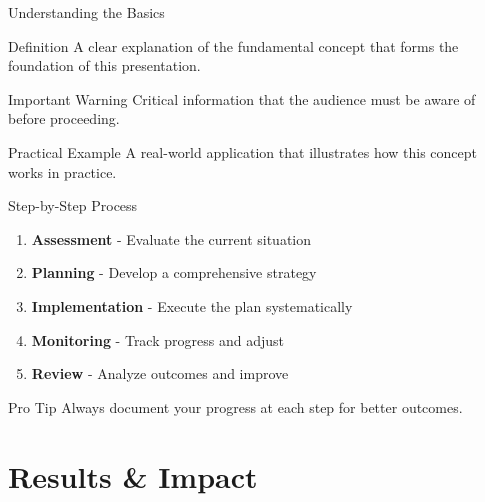 \documentclass[aspectratio=169]{beamer}
\begin{document}
\begin{frame}{Understanding the Basics}
    \begin{block}{Definition}
        A clear explanation of the fundamental concept that forms the foundation of this presentation.
    \end{block}

    \vspace{0.5cm}

    \begin{alertblock}{Important Warning}
        Critical information that the audience must be aware of before proceeding.
    \end{alertblock}

    \vspace{0.5cm}

    \begin{exampleblock}{Practical Example}
        A real-world application that illustrates how this concept works in practice.
    \end{exampleblock}
\end{frame}

\begin{frame}{Step-by-Step Process}
    \begin{enumerate}
        \item \textbf{Assessment} - Evaluate the current situation
        \item \textbf{Planning} - Develop a comprehensive strategy
        \item \textbf{Implementation} - Execute the plan systematically
        \item \textbf{Monitoring} - Track progress and adjust
        \item \textbf{Review} - Analyze outcomes and improve
    \end{enumerate}

    \vspace{1cm}

    \begin{tipbox}{Pro Tip}
        Always document your progress at each step for better outcomes.
    \end{tipbox}
\end{frame}

\section{Results \& Impact}
\end{document}
